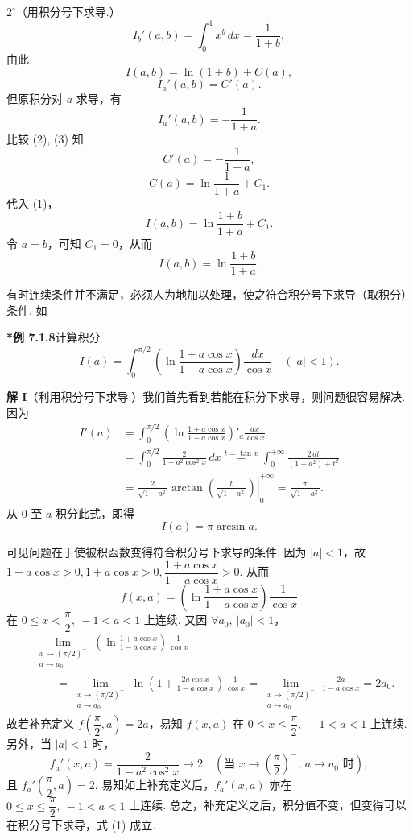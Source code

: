 \documentclass[UTF8, 12pt, fontset=fandol, oneside]{ctexart}
\begin{document}
$2^\circ$（用积分号下求导.）
\[
I_b'(a,b)=\int_0^1x^b\,dx=\frac1{1+b},
\]
由此
\begin{equation}
I(a,b)=\ln(1+b)+C(a),
\tag{1}
\end{equation}
\begin{equation}
I_a'(a,b)=C'(a).
\tag{2}
\end{equation}
但原积分对 $a$ 求导，有
\begin{equation}
I_a'(a,b)=-\frac1{1+a}.
\tag{3}
\end{equation}
比较 (2), (3) 知
\[
C'(a)=-\frac1{1+a},
\]
\[
C(a)=\ln\frac1{1+a}+C_1.
\]
代入 (1)，
\[
I(a,b)=\ln\frac{1+b}{1+a}+C_1.
\]
令 $a=b$，可知 $C_1=0$，从而
\[
I(a,b)=\ln\frac{1+b}{1+a}.
\]

有时连续条件并不满足，必须人为地加以处理，使之符合积分号下求导（取积分）条件. 如

\noindent\textbf{*例 7.1.8}\quad 计算积分
\[
I(a)=\int_0^{\pi/2}\left(\ln\frac{1+a\cos x}{1-a\cos x}\right)\frac{dx}{\cos x}\quad(|a|<1).
\]

\noindent\textbf{解 I}\quad （利用积分号下求导.）我们首先看到若能在积分下求导，则问题很容易解决. 因为
\[
\begin{aligned}
I'(a)
&=\int_0^{\pi/2}\left(\ln\frac{1+a\cos x}{1-a\cos x}\right)'_a\frac{dx}{\cos x}\\
&=\int_0^{\pi/2}\frac{2}{1-a^2\cos^2x}\,dx
\stackrel{t=\tan x}{=}\int_0^{+\infty}\frac{2\,dt}{(1-a^2)+t^2}\\
&=\left.\frac{2}{\sqrt{1-a^2}}
\arctan\left(\frac{t}{\sqrt{1-a^2}}\right)\right|_0^{+\infty}
=\frac{\pi}{\sqrt{1-a^2}}.
\end{aligned}
\tag{1}
\]
从 $0$ 至 $a$ 积分此式，即得
\[
I(a)=\pi\arcsin a.
\]

可见问题在于使被积函数变得符合积分号下求导的条件. 因为 $|a|<1$，故 $1-a\cos x>0,1+a\cos x>0,\dfrac{1+a\cos x}{1-a\cos x}>0$. 从而
\[
f(x,a)=\left(\ln\frac{1+a\cos x}{1-a\cos x}\right)\frac1{\cos x}
\]
在 $0\le x<\dfrac\pi2,\ -1<a<1$ 上连续. 又因 $\forall a_0,\ |a_0|<1$，
\[
\begin{aligned}
&\lim_{\substack{x\to(\pi/2)^-\\ a\to a_0}}
\left(\ln\frac{1+a\cos x}{1-a\cos x}\right)\frac1{\cos x}\\
&\qquad
=\lim_{\substack{x\to(\pi/2)^-\\ a\to a_0}}
\ln\left(1+\frac{2a\cos x}{1-a\cos x}\right)\frac1{\cos x}
=\lim_{\substack{x\to(\pi/2)^-\\ a\to a_0}}
\frac{2a}{1-a\cos x}=2a_0.
\end{aligned}
\]
故若补充定义 $f\left(\dfrac\pi2,a\right)=2a$，易知 $f(x,a)$ 在 $0\le x\le\dfrac\pi2,\ -1<a<1$ 上连续. 另外，当 $|a|<1$ 时，
\[
f_a'(x,a)=\frac2{1-a^2\cos^2x}\to2
\quad\left(\text{当 }x\to\left(\frac\pi2\right)^-,\ a\to a_0\text{ 时}\right),
\]
且 $f_a'\left(\dfrac\pi2,a\right)=2$. 易知如上补充定义后，$f_a'(x,a)$ 亦在 $0\le x\le\dfrac\pi2,\ -1<a<1$ 上连续. 总之，补充定义之后，积分值不变，但变得可以在积分号下求导，式 (1) 成立.
\end{document}
